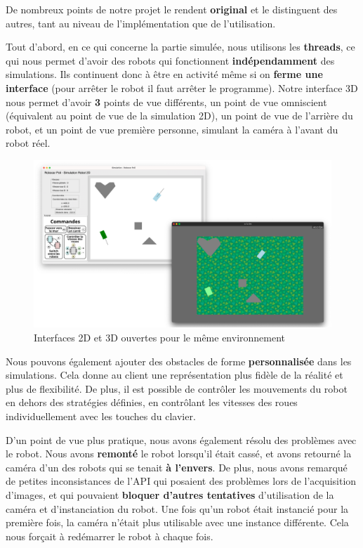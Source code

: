\documentclass[12pt]{article}
\begin{document}
\hspace{\parindent}De nombreux points de notre projet le rendent \textbf{original} et le distinguent des autres, tant au niveau de l’implémentation que de l’utilisation. 

\hspace{\parindent}Tout d’abord, en ce qui concerne la partie simulée, nous utilisons les \textbf{threads}, ce qui nous permet d’avoir des robots qui fonctionnent \textbf{indépendamment} des simulations. Ils continuent donc à être en activité même si on \textbf{ferme une interface} (pour arrêter le robot il faut arrêter le programme). Notre interface 3D nous permet d’avoir \textbf{3} points de vue différents, un point de vue omniscient (équivalent au point de vue de la simulation 2D), un point de vue de l'arrière du robot, et un point de vue première personne, simulant la caméra à l'avant du robot réel. 

\begin{figure}[h]
    \centering
    \includegraphics[width=1\linewidth]{double.png}
    \caption{Interfaces 2D et 3D ouvertes pour le même environnement}
    \label{fig:enter-label}
\end{figure}

\hspace{\parindent}Nous pouvons également ajouter des obstacles de forme \textbf{personnalisée} dans les simulations. Cela donne au client une représentation plus fidèle de la réalité et plus de flexibilité. De plus, il est possible de contrôler les mouvements du robot en dehors des stratégies définies, en contrôlant les vitesses des roues individuellement avec les touches du clavier.

\hspace{\parindent}D’un point de vue plus pratique, nous avons également résolu des problèmes avec le robot. Nous avons \textbf{remonté} le robot lorsqu’il était cassé, et avons retourné la caméra d’un des robots qui se tenait \textbf{à l’envers}. De plus, nous avons remarqué de petites inconsistances de l’API qui posaient des problèmes lors de l’acquisition d’images, et qui pouvaient \textbf{bloquer d’autres tentatives} d’utilisation de la caméra et d’instanciation du robot. Une fois qu'un robot était instancié pour la première fois, la caméra n'était plus utilisable avec une instance différente. Cela nous forçait à redémarrer le robot à chaque fois.
\end{document}
